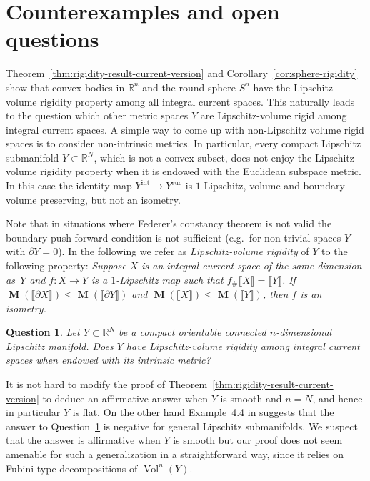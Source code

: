 \documentclass[reqno]{amsart}
\newtheorem{question}[theorem]{Question}
\numberwithin{equation}{section}
\newcommand{\vol}{\operatorname{Vol}}
\newcommand{\bb}[1]{\llbracket #1\rrbracket}
\DeclareMathOperator{\mass}{\mathbf{M}}
\begin{document}
\section{Counterexamples and open questions}\label{sec:8}
\label{sec:counterexamples-questions}
Theorem~\ref{thm:rigidity-result-current-version} and Corollary~\ref{cor:sphere-rigidity} show that convex bodies in $\mathbb{R}^n$ and the round sphere $S^n$ have the Lipschitz-volume rigidity property among all integral current spaces. This naturally leads to the question which other metric spaces $Y$ are Lipschitz-volume rigid among integral current spaces. A simple way to come up with non-Lipschitz volume rigid spaces is to consider non-intrinsic metrics. In particular, every compact Lipschitz submanifold $Y\subset\mathbb{R}^N$, which is not a convex subset, does not enjoy the Lipschitz-volume rigidity property when it is endowed with the Euclidean subspace metric. In this case the identity map $Y^{\text{int}}\to Y^{\text{euc}}$ is $1$-Lipschitz, volume and boundary volume preserving, but not an isometry. 

Note that in situations where Federer's constancy theorem is not valid the boundary push-forward  condition is not sufficient (e.g.\ for non-trivial spaces $Y$ with $\partial Y=0$).  In the following we refer as \emph{Lipschitz-volume rigidity} of $Y$ to the following property: \emph{Suppose $X$ is an integral current space of the same dimension as~$Y$ and $f\colon X\to Y$ is a $1$-Lipschitz map such that $f_{\#}\bb{X}=\bb{Y}$. If $\mass(\bb{\partial X})\leq \mass(\bb{\partial Y})$ and $\mass(\bb{X})\leq \mass(\bb{Y})$, then $f$ is an isometry.}

\begin{question}
\label{quest:which}
Let $Y\subset \mathbb{R}^N$ be a compact orientable connected $n$-dimensional Lipschitz manifold. Does $Y$ have Lipschitz-volume rigidity among integral current spaces when endowed with its intrinsic metric?
\end{question}

It is not hard to modify the proof of Theorem~\ref{thm:rigidity-result-current-version} to deduce an affirmative answer when $Y$ is smooth and $n=N$, and hence in particular $Y$ is flat. On the other hand Example~4.4 in \cite{CS20} suggests that the answer to Question~\ref{quest:which} is negative for general Lipschitz submanifolds. We suspect that the answer is affirmative when $Y$ is smooth but our proof does not seem amenable for such a generalization in a straightforward way, since it relies on Fubini-type decompositions of $\vol^n(Y)$.
\end{document}
